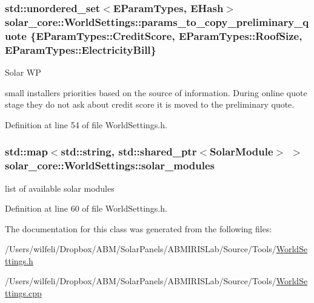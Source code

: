 \subsubsection[{params\+\_\+to\+\_\+copy\+\_\+preliminary\+\_\+quote}]{\setlength{\rightskip}{0pt plus 5cm}std\+::unordered\+\_\+set$<${\bf E\+Param\+Types}, {\bf E\+Hash}$>$ solar\+\_\+core\+::\+World\+Settings\+::params\+\_\+to\+\_\+copy\+\_\+preliminary\+\_\+quote \{{\bf E\+Param\+Types\+::\+Credit\+Score}, {\bf E\+Param\+Types\+::\+Roof\+Size}, {\bf E\+Param\+Types\+::\+Electricity\+Bill}\}}\label{classsolar__core_1_1_world_settings_a728f0b1c11f8ec1816d269aedc1cd80e}
\begin{DoxyRefDesc}{Solar W\+P}
\item[\hyperlink{wp__wp000008}{Solar W\+P}]small installers priorities based on the source of information. During online quote stage they do not ask about credit score it is moved to the preliminary quote. \end{DoxyRefDesc}


Definition at line 54 of file World\+Settings.\+h.

\hypertarget{classsolar__core_1_1_world_settings_acb33be8576dd4f60836373ea1b573fe6}{}
\subsubsection[{solar\+\_\+modules}]{\setlength{\rightskip}{0pt plus 5cm}std\+::map$<$std\+::string, std\+::shared\+\_\+ptr$<${\bf Solar\+Module}$>$ $>$ solar\+\_\+core\+::\+World\+Settings\+::solar\+\_\+modules}\label{classsolar__core_1_1_world_settings_acb33be8576dd4f60836373ea1b573fe6}
list of available solar modules 

Definition at line 60 of file World\+Settings.\+h.



The documentation for this class was generated from the following files\+:\begin{DoxyCompactItemize}
\item 
/\+Users/wilfeli/\+Dropbox/\+A\+B\+M/\+Solar\+Panels/\+A\+B\+M\+I\+R\+I\+S\+Lab/\+Source/\+Tools/\hyperlink{_world_settings_8h}{World\+Settings.\+h}\item 
/\+Users/wilfeli/\+Dropbox/\+A\+B\+M/\+Solar\+Panels/\+A\+B\+M\+I\+R\+I\+S\+Lab/\+Source/\+Tools/\hyperlink{_world_settings_8cpp}{World\+Settings.\+cpp}\end{DoxyCompactItemize}
